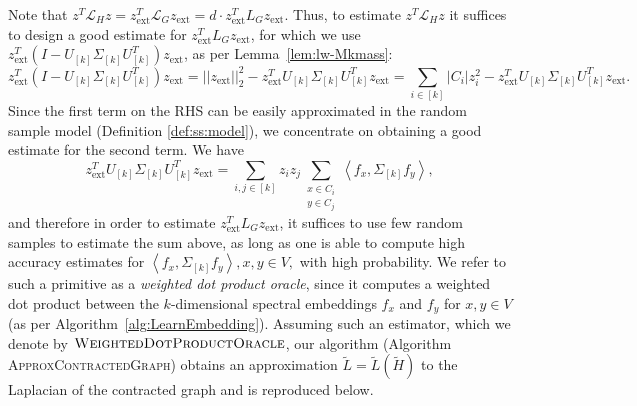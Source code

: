 \documentclass[letterpaper,11pt]{article}
\newcommand{\zext}{z_{\text{ext}}}
\theoremstyle{plain}
\theoremstyle{definition}
\theoremstyle{remark}
\newcommand{\rdp}[1]
  {\ensuremath{\left\langle #1 \right\rangle}}
\newcommand{\wt}[1]{\widetilde{#1}}
\begin{document}
Note that $z^T \mathcal{L}_H z = \zext^T \mathcal{L}_G \zext = d\cdot \zext^T L_G \zext.$ 
Thus, to estimate $z^T \mathcal{L}_H z$ it suffices to design a good estimate for $\zext^T L_G \zext$, for which we use $\zext^T(I - U_{[k]}\Sigma_{[k]} U_{[k]}^T)\zext$, as per Lemma~\ref{lem:lw-Mkmass}:
$$
\zext^T(I - U_{[k]}\Sigma_{[k]} U_{[k]}^T)\zext=||\zext||_2^2- \zext^TU_{[k]}\Sigma_{[k]} U_{[k]}^T\zext= \sum_{i\in [k]} |C_i| z_i^2- \zext^TU_{[k]}\Sigma_{[k]} U_{[k]}^T\zext.
$$
Since the first term on the RHS can be easily approximated in the random sample model (Definition \ref{def:ss:model}), we concentrate on obtaining a good estimate for the second term. We have
\begin{equation}
	\zext^T U_{[k]} \Sigma_{[k]} U_{[k]}^T \zext = \sum_{i,j \in [k]} z_i z_j \sum_{\substack{x \in C_i\\y \in C_j}} \rdp{f_x, \Sigma_{[k]} f_y},
\end{equation}
and therefore in order to estimate $\zext^T  L_G \zext$, it suffices to use few random samples to estimate the sum above, as long as one is able to compute high accuracy estimates for  $\rdp{f_x, \Sigma_{[k]} f_y}, x, y\in V,$ with high probability. We refer to such a primitive as a {\em weighted dot product oracle}, since it computes a weighted dot product between the $k$-dimensional spectral embeddings $f_x$ 
 and $f_y$ for $x,y\in V$ (as per Algorithm~\ref{alg:LearnEmbedding}). Assuming such an estimator, which we denote by $\textsc{WeightedDotProductOracle}$,  our algorithm (Algorithm \textsc{ApproxContractedGraph}) obtains an approximation $\wt{L} = \wt{L}(\wt{H})$ to the Laplacian of the contracted graph and is reproduced below.  
 
\end{document}
